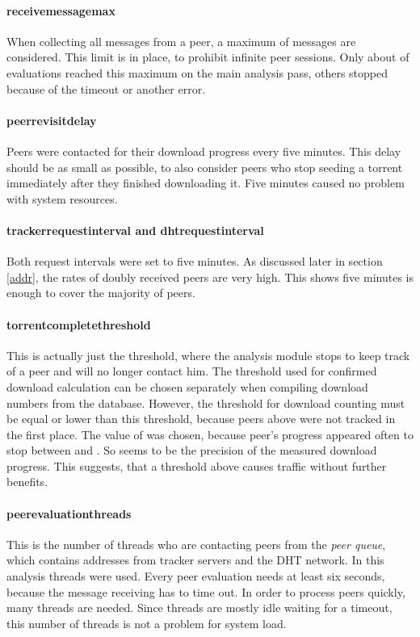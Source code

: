 \documentclass[10pt, a4paper, twoside=false, headsepline]{scrbook}
\renewcommand{\_}{\origunderscore\allowbreak}
\begin{document}
\paragraph{receive\_message\_max}
When collecting all messages from a peer, a maximum of  messages are considered. This limit is in place, to prohibit infinite peer sessions. Only about  of evaluations reached this maximum on the main analysis pass, others stopped because of the timeout or another error.

\paragraph{peer\_revisit\_delay}
Peers were contacted for their download progress every five minutes. This delay should be as small as possible, to also consider peers who stop seeding a torrent immediately after they finished downloading it. Five minutes caused no problem with system resources.

\paragraph{tracker\_request\_interval and dht\_request\_interval}
Both request intervals were set to five minutes. As discussed later in section \ref{addr}, the rates of doubly received peers are very high. This shows five minutes is enough to cover the majority of peers.

\paragraph{torrent\_complete\_threshold}
This is actually just the threshold, where the analysis module stops to keep track of a peer and will no longer contact him. The threshold used for confirmed download calculation can be chosen separately when compiling download numbers from the database. However, the threshold for download counting must be equal or lower than this threshold, because peers above were not tracked in the first place. The value of  was chosen, because peer's progress appeared often to stop between  and . So  seems to be the precision of the measured download progress. This suggests, that a threshold above  causes traffic without further benefits.

\paragraph{peer\_evaluation\_threads}
This is the number of threads who are contacting peers from the \emph{peer queue}, which contains addresses from tracker servers and the DHT network. In this analysis  threads were used. Every peer evaluation needs at least six seconds, because the message receiving has to time out. In order to process peers quickly, many threads are needed. Since threads are mostly idle waiting for a timeout, this number of threads is not a problem for system load.
\end{document}
